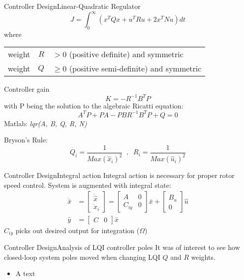 \begin{frame}{Controller Design}{Linear-Quadratic Regulator}
	\begin{equation}\label{eq:lqr_cost}
		J = \int_{0}^{\infty} \left(x^T Q x + u^T R u + 2x^T N u\right) dt
	\end{equation}
	where
	\begin{center}
		\begin{tabular}{l r l }
			weight & $R$         & $ > 0$\hspace{1mm} (positive definite) and symmetric       \\
			weight & $Q$		 & $\ge 0$\hspace{1mm} (positive semi-definite) and symmetric
		\end{tabular}
	\end{center}
	Controller gain
	\begin{equation}\label{eq:lqr_K}
		K = -R^{-1} B^T P
	\end{equation}
	with P being the solution to the algebraic Ricatti equation:
	\begin{equation}\label{lqr:ricatti}
		A^T P + P A - P B R^{-1} B^T P + Q = 0
	\end{equation}
	Matlab: \textit{lqr(A, B, Q, R, N)}
	
	\smallskip
	Bryson's Rule:
	\begin{equation}\label{eq:bryson}
			Q_i = \dfrac{1}{Max(\hat x_i)^2} \;\; , \;\; R_i = \dfrac{1}{Max(\hat u_i)^2}
	\end{equation}
\end{frame}


\begin{frame}{Controller Design}{Integral action}
	Integral action is necessary for proper rotor speed control. System is augmented with integral state:
	\begin{align} 
		\dot {\bar x} & = \begin{bmatrix} \dot{\hat x} \\ \dot x_i \end{bmatrix} = \begin{bmatrix} A &0 \\ C_{iy} & 0 \end{bmatrix} \bar x + \begin{bmatrix} B_u \\ 0 \end{bmatrix}  \hat u \\
		\bar y & = \begin{bmatrix} C & 0 \end{bmatrix} \bar x
	\end{align}
	$ C_{iy} $ picks out desired output for integration ($\Omega$)
\end{frame}



\begin{frame}{Controller Design}{Analysis of LQI controller poles}
	It was of interest to see how closed-loop system poles moved when changing LQI $ Q $ and $ R $ weights.
	\begin{itemize}
		\item A text
	\end{itemize}\bigskip
\end{frame}